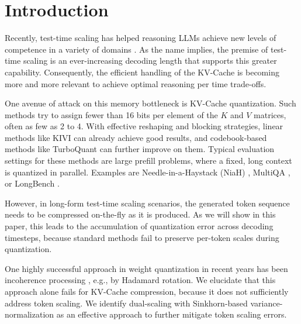 \documentclass{article}
\begin{document}
\begin{abstract}
\end{abstract}

\section{Introduction}
Recently,  test-time scaling \cite{openai2024learning} has helped reasoning LLMs achieve new levels of competence in a variety of domains \cite{snell2025scaling, pmlr-v267-bi25a-Forest-of-Thought, muennighoff2025s1, shen2026thinking}. As the name implies, the premise of test-time scaling is an ever-increasing decoding length that supports this greater capability. Consequently, the efficient handling of the KV-Cache is becoming more and more relevant to achieve optimal reasoning per time trade-offs. 


One avenue of attack on this memory bottleneck is KV-Cache quantization. Such methods try to assign fewer than 16 bits per element of the $K$ and $V$ matrices, often as few as 2 to 4. With effective reshaping and blocking strategies, linear methods like KIVI \cite{KIVI} can already achieve good results, and codebook-based methods like TurboQuant \cite{zandieh2026turboquant} can further improve on them. 
Typical evaluation settings for these methods are large prefill problems, where a fixed, long context is quantized in parallel. Examples are Needle-in-a-Haystack (NiaH) \cite{kamradt2023needle}, MultiQA \cite{talmor-berant-2019-multiqa}, or LongBench \cite{bai2024longbench}. 

However, in long-form test-time scaling scenarios, the generated token sequence needs to be compressed on-the-fly as it is produced. As we will show in this paper, this leads to the accumulation of quantization error across decoding timesteps, because standard methods fail to preserve per-token scales during quantization. %

One highly successful approach in weight quantization in recent years has been incoherence processing \cite{chee2023quip}, e.g., by Hadamard rotation. We elucidate that this approach alone fails for KV-Cache compression, because it does not sufficiently address token scaling. We identify dual-scaling with Sinkhorn-based variance-normalization as an effective approach to further mitigate token scaling errors. 
\end{document}
